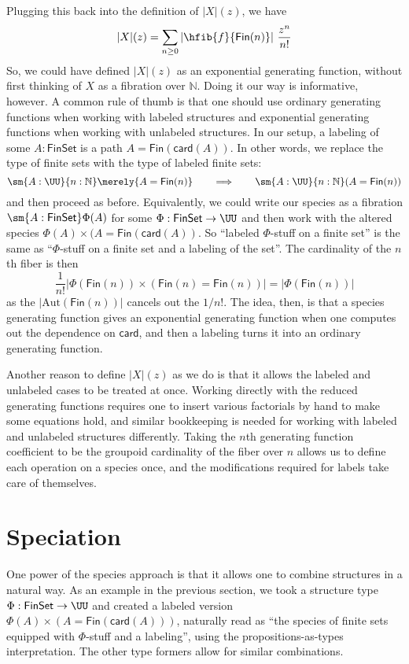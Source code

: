 \documentclass[fleqn]{article}
\newcommand{\card}{\mathsf{card}}
\newcommand{\gf}[1]{\abs{#1}\!(z)}
\newcommand{\fin}{\mathsf{Fin}}
\newcommand{\finset}{\mathsf{FinSet}}
\newcommand{\abs}[1]{\left\lvert #1 \right\rvert}
\newcommand{\Aut}{\mathrm{Aut}}
\theoremstyle{theorem}
\theoremstyle{definition}
\begin{document}
Plugging this back into the definition of $\gf{X}$, we have
\[
  \gf{X} = \sum_{n\geq0} \abs{\hfib{f}{\fin(n)}}\, \frac{z^{n}}{n!}
\]
So, we could have defined $\gf{X}$ as an exponential generating function,
without first thinking of $X$ as a fibration over $\mathbb{N}$.  Doing it our
way is informative, however.  A common rule of thumb is that one should use
ordinary generating functions when working with labeled structures and
exponential generating functions when working with unlabeled structures.  In
our setup, a labeling of some $A : \finset$ is a path $A = \fin(\card(A))$.  In
other words, we replace the type of finite sets with the type of labeled finite
sets:
\[
  \sm{A : \UU}{n: \mathbb{N}} \merely{A = \fin(n)}
  \qquad\Longrightarrow\qquad
  \sm{A : \UU}{n : \mathbb{N}} (A = \fin(n))
\]
and then proceed as before.  Equivalently, we could write our species as a
fibration $\sm{A:\finset}\Phi(A)$ for some $\Phi : \finset \to \UU$ and then
work with the altered species $\Phi(A) \times (A = \fin(\card(A))$.  So
``labeled $\Phi$-stuff on a finite set'' is the same as ``$\Phi$-stuff on a
finite set and a labeling of the set''.  The cardinality of the $n$th fiber is
then
\[
  \frac{1}{n!}
  \abs{
    \Phi(\fin(n)) \times (\fin(n) = \fin(n))
  }
  =
  \abs{\Phi(\fin(n))}
\]
as the $\abs{\Aut(\fin(n))}$ cancels out the $1/n!$.  The idea, then, is that a
species generating function gives an exponential generating function when one
computes out the dependence on $\card$, and then a labeling turns it into an
ordinary generating function.

Another reason to define $\gf{X}$ as we do is that it allows the labeled and
unlabeled cases to be treated at once.  Working directly with the reduced
generating functions requires one to insert various factorials by hand to make
some equations hold, and similar bookkeeping is needed for working with labeled
and unlabeled structures differently.  Taking the $n$th generating function
coefficient to be the groupoid cardinality of the fiber over $n$ allows us to
define each operation on a species once, and the modifications required for
labels take care of themselves.


\section{Speciation}

One power of the species approach is that it allows one to combine structures
in a natural way.  As an example in the previous section, we took a structure
type $\Phi : \finset \to \UU$ and created a labeled version $\Phi(A) \times (A
= \fin(\card(A)))$, naturally read as ``the species of finite sets equipped
with $\Phi$-stuff and a labeling'', using the propositions-as-types
interpretation.  The other type formers allow for similar combinations.
\end{document}
